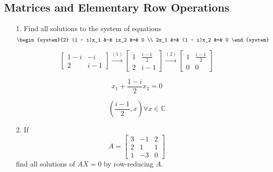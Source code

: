 \documentclass{article}
\begin{document}
\subsection{Matrices and Elementary Row Operations}

\begin{enumerate}[listparindent=\parindent]

\item[1.] Find all solutions to the system of equations
    \[
        \begin{system}{2}
            (1 - i)x_1 &-& ix_2 &=& 0 \\
            2x_1 &+& (1 - i)x_2 &=& 0
        \end{system}
    \]

\[
    \begin{bmatrix}
        1 - i & -i \\
        2 & i - 1
    \end{bmatrix}
    \xrightarrow{(1)}
    \begin{bmatrix}
        1 & \frac{i - 1}{2} \\
        2 & i - 1
    \end{bmatrix}
    \xrightarrow{(2)}
    \begin{bmatrix}
        1 & \frac{i - 1}{2} \\
        0 & 0
    \end{bmatrix}
\]

\[ x_1 + \frac{1 - i}{2}x_2 = 0 \]

\[
    \boxed{
        (\frac{i - 1}{2}, x) \forall x \in \mathbb{C}
    }
\]

\item[2.] If
    \[
        A = \begin{bmatrix}
            3 & -1 & 2 \\
            2 & 1 & 1 \\
            1 & -3 & 0
        \end{bmatrix}
    \]
    find all solutions of \(AX = 0\) by row-reducing \(A\).


\end{enumerate}
\end{document}
